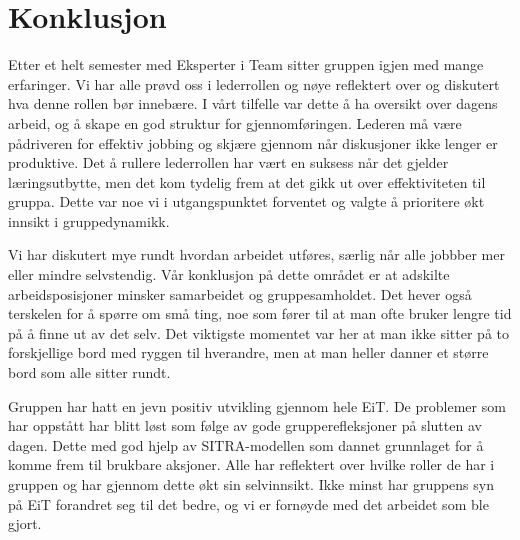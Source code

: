 \chapter{Konklusjon}

Etter et helt semester med Eksperter i Team sitter gruppen igjen med mange erfaringer. 
Vi har alle prøvd oss i lederrollen og nøye reflektert over og diskutert hva denne rollen bør innebære. 
I vårt tilfelle var dette å ha oversikt over dagens arbeid, og å skape en god struktur for gjennomføringen. 
Lederen må være pådriveren for effektiv jobbing og skjære gjennom når diskusjoner ikke lenger er produktive. 
Det å rullere lederrollen har vært en suksess når det gjelder læringsutbytte, men det kom tydelig frem at det gikk ut over effektiviteten til gruppa. 
Dette var noe vi i utgangspunktet forventet og valgte å prioritere økt innsikt i gruppedynamikk.
\vspace{\secspace}

Vi har diskutert mye rundt hvordan arbeidet utføres, særlig når alle jobbber mer eller mindre selvstendig. 
Vår konklusjon på dette området er at adskilte arbeidsposisjoner minsker samarbeidet og gruppesamholdet.
Det hever også terskelen for å spørre om små ting, noe som fører til at man ofte bruker lengre tid på å finne ut av det selv.
Det viktigste momentet var her at man ikke sitter på to forskjellige bord med ryggen til hverandre, men at man heller danner et større bord som alle sitter rundt.
\vspace{\secspace}

Gruppen har hatt en jevn positiv utvikling gjennom hele EiT. 
De problemer som har oppstått har blitt løst som følge av gode grupperefleksjoner på slutten av dagen. 
Dette med god hjelp av SITRA-modellen som dannet grunnlaget for å komme frem til brukbare aksjoner. 
Alle har reflektert over hvilke roller de har i gruppen og har gjennom dette økt sin selvinnsikt.
Ikke minst har gruppens syn på EiT forandret seg til det bedre, og vi er fornøyde med det arbeidet som ble gjort. 
